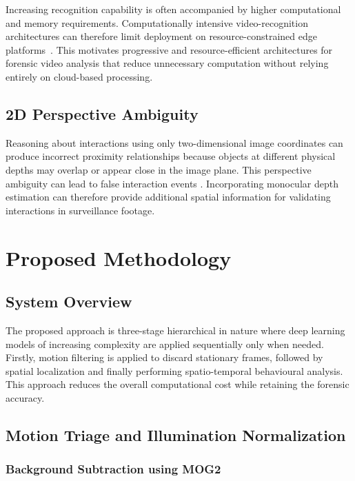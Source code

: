 \documentclass[runningheads]{llncs}
\begin{document}
Increasing recognition capability is often accompanied by higher
computational and memory requirements. Computationally intensive
video-recognition architectures can therefore limit deployment on
resource-constrained edge platforms~\cite{liu2022video,feichtenhofer2019slowfast}.
This motivates progressive and resource-efficient architectures for forensic
video analysis that reduce unnecessary computation without relying entirely
on cloud-based processing.

\subsection{2D Perspective Ambiguity}

Reasoning about interactions using only two-dimensional image coordinates can
produce incorrect proximity relationships because objects at different
physical depths may overlap or appear close in the image plane. This
perspective ambiguity can lead to false interaction events
\cite{monovit,yang2024depth}. Incorporating monocular depth
estimation can therefore provide additional spatial information for
validating interactions in surveillance footage.

\section{Proposed Methodology}
\label{sec:methodology}

\subsection{System Overview}

The proposed approach is three-stage hierarchical in nature where deep learning models of increasing complexity are applied sequentially only when needed. Firstly, motion filtering is applied to discard stationary frames, followed by spatial localization and finally performing spatio-temporal behavioural analysis. This approach reduces the overall computational cost while retaining the forensic accuracy.

\subsection{Motion Triage and Illumination Normalization}
\subsubsection{Background Subtraction using MOG2}
\end{document}

